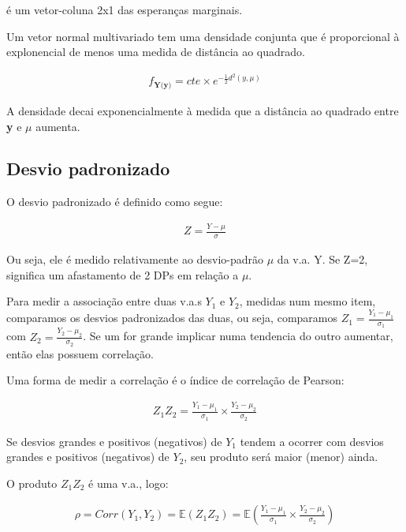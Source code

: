 \documentclass[11pt,a4paper]{article}
\begin{document}
		é um vetor-coluna 2x1 das esperanças marginais.
		
		Um vetor normal multivariado tem uma densidade conjunta que é proporcional à explonencial de menos uma medida de distância ao quadrado.
		
		\begin{eqnarray*}
			f_\textbf{Y(y)}=cte\times e^{-\frac{1}{2}d^2(y,\mu)}
		\end{eqnarray*}
		
		A densidade decai exponencialmente à medida que a distância ao quadrado entre \textbf{y} e \textbf{$\mu$} aumenta.
		
		\subsection{Desvio padronizado}
		
		O desvio padronizado é definido como segue:
		
		\begin{eqnarray*}
			Z=\frac{Y-\mu}{\sigma}
		\end{eqnarray*}
		
		Ou seja, ele é medido relativamente ao desvio-padrão $\mu$ da v.a. Y.
		Se Z=2, significa um afastamento de 2 DPs em relação a $\mu$.
		
		Para medir a associação entre duas v.a.s $Y_1$ e $Y_2$, medidas num mesmo item, comparamos os desvios padronizados das duas, ou seja, comparamos $Z_1=\frac{Y_1-\mu_1}{\sigma_1}$ com $Z_2=\frac{Y_2-\mu_2}{\sigma_2}$.
		Se um for grande implicar numa tendencia do outro aumentar, então elas possuem correlação.
		
		Uma forma de medir a correlação é o índice de correlação de Pearson:
		
		\begin{eqnarray*}
			Z_1Z_2=\frac{Y_1-\mu_1}{\sigma_1}\times\frac{Y_2-\mu_2}{\sigma_2}
		\end{eqnarray*}
		
		Se desvios grandes e positivos (negativos) de $Y_1$ tendem a ocorrer com desvios grandes e positivos (negativos) de $Y_2$, seu produto será maior (menor) ainda.
		
		O produto $Z_1Z_2$ é uma v.a., logo:
		
		\begin{eqnarray*}
			\rho=Corr(Y_1,Y_2)=\mathbb{E}(Z_1Z_2)=\mathbb{E}(\frac{Y_1-\mu_1}{\sigma_1}\times\frac{Y_2-\mu_2}{\sigma_2})
		\end{eqnarray*}
		
\end{document}
